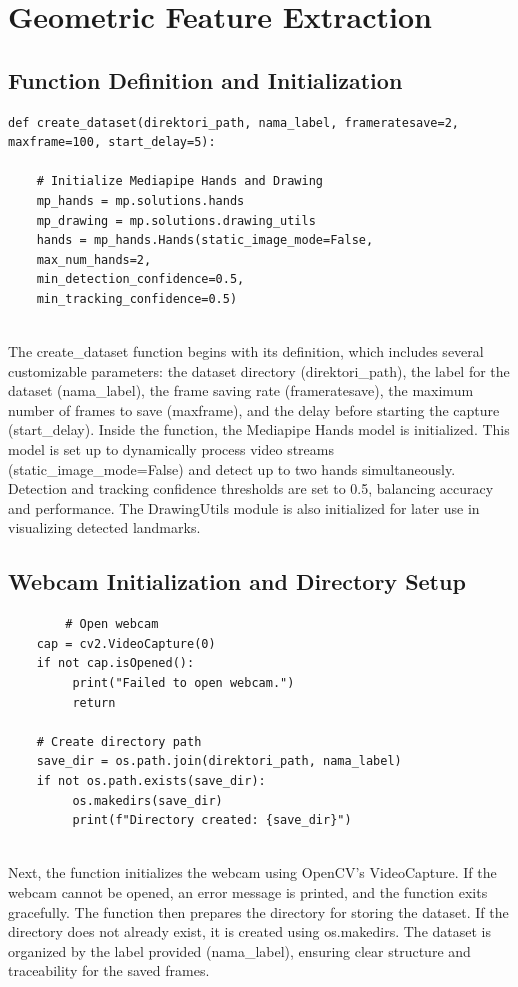 \section{Geometric Feature Extraction}

\subsection{Function Definition and Initialization}
\begin{lstlisting}
def create_dataset(direktori_path, nama_label, frameratesave=2, maxframe=100, start_delay=5):
	
	# Initialize Mediapipe Hands and Drawing
	mp_hands = mp.solutions.hands
	mp_drawing = mp.solutions.drawing_utils
	hands = mp_hands.Hands(static_image_mode=False,
	max_num_hands=2,
	min_detection_confidence=0.5,
	min_tracking_confidence=0.5)
	
\end{lstlisting}
The create\_dataset function begins with its definition, which includes several customizable parameters: the dataset directory (direktori\_path), the label for the dataset (nama\_label), the frame saving rate (frameratesave), the maximum number of frames to save (maxframe), and the delay before starting the capture (start\_delay). Inside the function, the Mediapipe Hands model is initialized. This model is set up to dynamically process video streams (static\_image\_mode=False) and detect up to two hands simultaneously. Detection and tracking confidence thresholds are set to 0.5, balancing accuracy and performance. The DrawingUtils module is also initialized for later use in visualizing detected landmarks.
\subsection{Webcam Initialization and Directory Setup}
\begin{lstlisting}
	    # Open webcam
	cap = cv2.VideoCapture(0)
	if not cap.isOpened():
	     print("Failed to open webcam.")
	     return
	
	# Create directory path
	save_dir = os.path.join(direktori_path, nama_label)
	if not os.path.exists(save_dir):
	     os.makedirs(save_dir)
	     print(f"Directory created: {save_dir}")
	
\end{lstlisting}
Next, the function initializes the webcam using OpenCV’s VideoCapture. If the webcam cannot be opened, an error message is printed, and the function exits gracefully. The function then prepares the directory for storing the dataset. If the directory does not already exist, it is created using os.makedirs. The dataset is organized by the label provided (nama\_label), ensuring clear structure and traceability for the saved frames.

